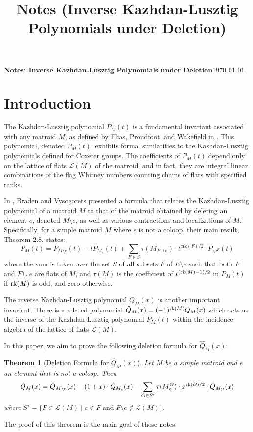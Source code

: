 \documentclass[10pt]{article}
\title{Notes (Inverse Kazhdan-Lusztig Polynomials under Deletion)}
\newcommand{\calL}{\mathcal{L}}
\newcommand{\rank}{\normalfont\text{rk}}
\newtheorem{theorem}{Theorem}
\theoremstyle{remark}
\begin{document}
{\textbf{Notes: Inverse Kazhdan-Lusztig Polynomials under Deletion}}\hfill {\small{\today}}

\hrulefill %

\section{Introduction}
The Kazhdan-Lusztig polynomial $P_M(t)$ is a fundamental invariant associated with any matroid $M$,
as defined by Elias, Proudfoot, and Wakefield in \cite{EPW16}. This polynomial, denoted $P_M(t)$,
exhibits formal similarities to the Kazhdan-Lusztig polynomials defined for Coxeter groups.
The coefficients of $P_M(t)$ depend only on the lattice of flats $\calL(M)$ of the matroid,
and in fact, they are integral linear combinations of the flag Whitney numbers counting chains of flats
with specified ranks.

In \cite{Bra19}, Braden and Vysogorets presented a formula that relates the Kazhdan-Lusztig polynomial
of a matroid $M$ to that of the matroid obtained by deleting an element $e$, denoted $M\setminus e$, as well as various contractions and localizations of $M$. Specifically, for a simple matroid $M$ where $e$ is not a coloop, their main result, Theorem 2.8, states:
\[
P_M(t) = P_{M\setminus e}(t) - tP_{M_e}(t) + \sum_{F\in S} \tau(M_{F\cup e})\cdot
t^{\text{crk}(F)/2}\cdot P_{M^F}(t)
\]
where the sum is taken over the set $S$ of all subsets $F$ of $E \setminus e$ such that both $F$ and $F \cup e$ are flats of $M$, and $\tau(M)$ is the coefficient of $t^{(\rank(M)-1)/2}$ in $P_M(t)$ if $\rank(M)$ is odd, and zero otherwise.

The inverse Kazhdan-Lusztig polynomial $Q_M(x)$ is another important invariant.
There is a related polynomial $\hat{Q}_M(x) = (-1)^{\rank(M)} Q_M(x)$ which acts as the inverse of
the Kazhdan-Lusztig polynomial $P_M(t)$ within the incidence algebra of the lattice of flats $\calL(M)$.

In this paper, we aim to prove the following deletion formula for $\hat{Q}_M(x)$:
\begin{theorem}[Deletion Formula for $\hat{Q}_M(x)$]
\label{thm:deletion_formula_Q_hat}
Let $M$ be a simple matroid and $e$ an element that is not a coloop. Then
\[
    \hat{Q}_M(x) = \hat{Q}_{M\setminus e}(x) -(1 + x)\cdot \hat{Q}_{M_e}(x) -
    \sum_{G \in S'}{\tau(M^G_e)\cdot x^{\rank(G)/2}\cdot
    \hat{Q}_{M_G}(x)}
\]
where $S' = \{F\in \calL(M)\mid e\in F \text{ and } F\setminus e \notin \calL(M)\}$.
\end{theorem}
The proof of this theorem is the main goal of these notes.
\end{document}
